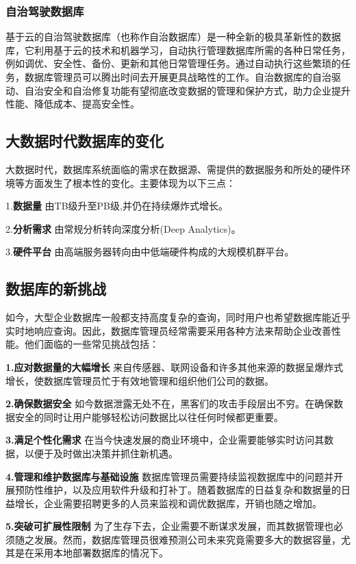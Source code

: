 \documentclass[a4paper,12pt]{article}
\begin{document}
\subsubsection{自治驾驶数据库}
基于云的自治驾驶数据库（也称作自治数据库）是一种全新的极具革新性的数据库，它利用基于云的技术和机器学习，自动执行管理数据库所需的各种日常任务，例如调优、安全性、备份、更新和其他日常管理任务。通过自动执行这些繁琐的任务，数据库管理员可以腾出时间去开展更具战略性的工作。自治数据库的自治驱动、自治安全和自治修复功能有望彻底改变数据的管理和保护方式，助力企业提升性能、降低成本、提高安全性。

\subsection{大数据时代数据库的变化}
大数据时代，数据库系统面临的需求在数据源、需提供的数据服务和所处的硬件环境等方面发生了根本性的变化。主要体现为以下三点：

1.\textbf{数据量}  由TB级升至PB级,并仍在持续爆炸式增长。

2.\textbf{分析需求}  由常规分析转向深度分析(Deep Analytics)。

3.\textbf{硬件平台}  由高端服务器转向由中低端硬件构成的大规模机群平台\cite{01}。

\subsection{数据库的新挑战}
如今，大型企业数据库一般都支持高度复杂的查询，同时用户也希望数据库能近乎实时地响应查询。因此，数据库管理员经常需要采用各种方法来帮助企业改善性能。他们面临的一些常见挑战包括：

\textbf{1.应对数据量的大幅增长} 来自传感器、联网设备和许多其他来源的数据呈爆炸式增长，使数据库管理员忙于有效地管理和组织他们公司的数据。

\textbf{2.确保数据安全} 如今数据泄露无处不在，黑客们的攻击手段层出不穷。在确保数据安全的同时让用户能够轻松访问数据比以往任何时候都更重要。

\textbf{3.满足个性化需求} 在当今快速发展的商业环境中，企业需要能够实时访问其数据，以便于及时做出决策并抓住新机遇。

\textbf{4.管理和维护数据库与基础设施} 数据库管理员需要持续监视数据库中的问题并开展预防性维护，以及应用软件升级和打补丁。随着数据库的日益复杂和数据量的日益增长，企业需要招聘更多的人员来监视和调优数据库，开销也随之增加。

\textbf{5.突破可扩展性限制} 为了生存下去，企业需要不断谋求发展，而其数据管理也必须随之发展。然而，数据库管理员很难预测公司未来究竟需要多大的数据容量，尤其是在采用本地部署数据库的情况下。
\end{document}
